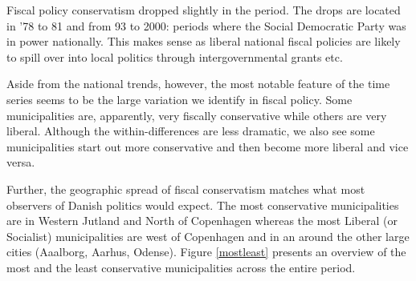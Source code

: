 \documentclass[a4paper,12pt]{article}
\begin{document}
Fiscal policy conservatism dropped slightly in the period. The drops are located in '78 to 81 and from 93 to 2000: periods where the Social Democratic Party was in power nationally. This makes sense as liberal national fiscal policies are likely to spill over into local politics through intergovernmental grants etc.

Aside from the national trends, however, the most notable feature of the time series seems to be the large variation we identify in fiscal policy. Some municipalities are, apparently, very fiscally conservative while others are very liberal. Although the within-differences are less dramatic, we also see some municipalities start out more conservative and then become more liberal and vice versa.

Further, the geographic spread of fiscal conservatism matches what most observers of Danish politics would expect. The most conservative municipalities are in Western Jutland and North of Copenhagen whereas the most Liberal (or Socialist) municipalities are west of Copenhagen and in an around the other large cities (Aaalborg, Aarhus, Odense). 
Figure \ref{mostleast} presents an overview of the most and the least conservative municipalities across the entire period.
\end{document}
